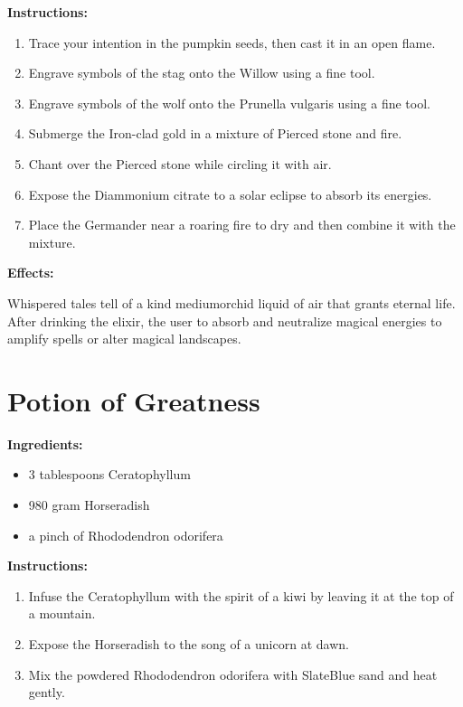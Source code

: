 \documentclass{article}
\begin{document}
\textbf{Instructions:}

\begin{enumerate}
  \item Trace your intention in the pumpkin seeds, then cast it in an open flame.
  \item Engrave symbols of the stag onto the Willow using a fine tool.
  \item Engrave symbols of the wolf onto the Prunella vulgaris using a fine tool.
  \item Submerge the Iron-clad gold in a mixture of Pierced stone and fire.
  \item Chant over the Pierced stone while circling it with air.
  \item Expose the Diammonium citrate to a solar eclipse to absorb its energies.
  \item Place the Germander near a roaring fire to dry and then combine it with the mixture.
\end{enumerate}

\textbf{Effects:}

Whispered tales tell of a kind mediumorchid liquid of air that grants eternal life. After drinking the elixir, the user to absorb and neutralize magical energies to amplify spells or alter magical landscapes.

\newpage
\section*{Potion of Greatness}

\textbf{Ingredients:}

\begin{itemize}
  \item 3 tablespoons Ceratophyllum
  \item 980 gram Horseradish
  \item a pinch of Rhododendron odorifera
\end{itemize}

\textbf{Instructions:}

\begin{enumerate}
  \item Infuse the Ceratophyllum with the spirit of a kiwi by leaving it at the top of a mountain.
  \item Expose the Horseradish to the song of a unicorn at dawn.
  \item Mix the powdered Rhododendron odorifera with SlateBlue sand and heat gently.
\end{enumerate}
\end{document}
